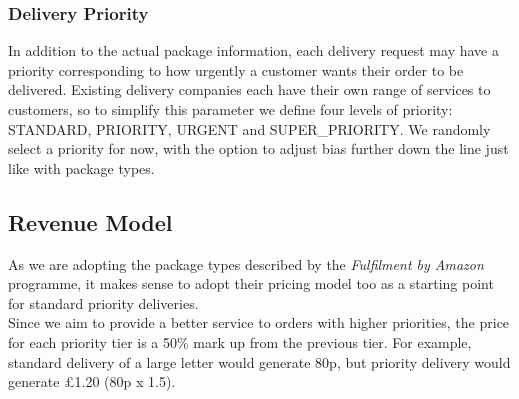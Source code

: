 \documentclass[a4paper,12pt,titlepage]{article}
\begin{document}
\subsubsection{Delivery Priority}
In addition to the actual package information, each delivery request may have a priority corresponding to how urgently a customer wants their order to be delivered. Existing delivery companies each have their own range of services to customers, so to simplify this parameter we define four levels of priority: STANDARD, PRIORITY, URGENT and SUPER\_PRIORITY. We randomly select a priority for now, with the option to adjust bias further down the line just like with package types.

\subsection{Revenue Model}
As we are adopting the package types described by the \textit{Fulfilment by Amazon} programme, it makes sense to adopt their pricing model too as a starting point for standard priority deliveries.\\

Since we aim to provide a better service to orders with higher priorities, the price for each priority tier is a 50\% mark up from the previous tier. For example, standard delivery of a large letter would generate 80p, but priority delivery would generate £1.20 (80p x 1.5).
\end{document}
